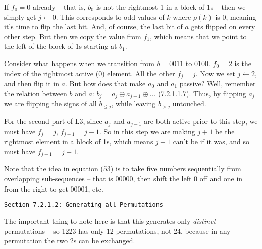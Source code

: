 If $f_0 = 0$ already -- that is, $b_0$ is not the rightmost 1
in a block of 1s -- then we simply get $j \gets 0$.  This corresponds
to odd values of $k$ where $\rho\left(k\right)$ is 0, meaning it's
time to flip the last bit.  And, of course, the last bit of $a$ gets
flipped on every other step.  But then we copy the value from $f_1$,
which means that we point to the left of the block of 1s starting at
$b_1$.

Consider what happens when we transition from $b=0011$
to $0100$.  $f_0 = 2$ is the index of the rightmost active (0) element.
All the other $f_j = j$. Now we set $j \gets 2$, and then flip it in $a$.
But how does that make $a_0$ and $a_1$ passive?  Well, remember
the relation between $b$ and $a$: $b_j = a_j \oplus a_{j+1} \oplus \ldots$
(7.2.1.1.7). Thus, by flipping $a_j$ we are flipping the signs of all $b_{\le j}$,
while leaving $b_{>j}$ untouched.

For the second part of L3, since $a_j$ and $a_{j-1}$ are both active
prior to this step, we must have $f_j = j$, $f_{j-1} = j - 1$.  So
in this step we are making $j+1$ be the rightmost element in a block of 1s,
which means $j+1$ can't be if it was, and so must have $f_{j+1} = j + 1$.

\vskip 0.08in 

\noindent [p 302] Note that the idea in equation (53) is to take five
numbers sequentially from overlapping sub-sequences -- that is
00000, then shift the left 0 off and one in from the right to get 00001,
etc.


\vfil\break
\centerline{\tt Section 7.2.1.2: Generating all Permutations}
\vskip 0.2in

 The important thing to note here is that
this generates only {\it distinct} permutations -- so 1223 has only 12
permutations, not 24, because in any permutation the two 2s can be
exchanged.


